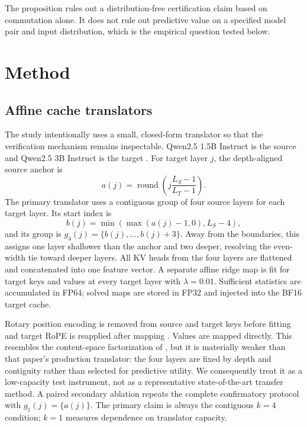 \documentclass[10pt,twocolumn]{article}
\begin{document}
The proposition rules out a distribution-free certification claim based on
commutation alone.  It does not rule out predictive value on a specified
model pair and input distribution, which is the empirical question tested
below.

\section{Method}

\subsection{Affine cache translators}

The study intentionally uses a small, closed-form translator so that the
verification mechanism remains inspectable.  Qwen2.5 1.5B Instruct is the
source and Qwen2.5 3B Instruct is the target \citep{qwen2024qwen25}.  For
target layer $j$, the depth-aligned source anchor is
\begin{equation}
  a(j)=\operatorname{round}\!\left(
  j\frac{L_S-1}{L_T-1}\right).
  \label{eq:layer-map}
\end{equation}
The primary translator uses a contiguous group of four source layers for each
target layer.  Its start index is
\begin{equation}
  b(j)=\min\!\left(\max(a(j)-1,0),L_S-4\right),
\end{equation}
and its group is $g_4(j)=\{b(j),\ldots,b(j)+3\}$.  Away from the boundaries,
this assigns one layer shallower than the anchor and two deeper, resolving the
even-width tie toward deeper layers.  All KV heads from the four layers are
flattened and concatenated into one feature vector.  A separate affine ridge
map is fit for target keys and values at every target layer with
$\lambda=0.01$.  Sufficient statistics are accumulated in FP64; solved maps
are stored in FP32 and injected into the BF16 target cache.

Rotary position encoding is removed from source and target keys before fitting
and target RoPE is reapplied after mapping \citep{su2024roformer}.  Values are
mapped directly.  This resembles the content-space factorization of
\citet{heo2026crossmodel}, but it is materially weaker than that paper's
production translator: the four layers are fixed by depth and contiguity
rather than selected for predictive utility.  We consequently treat it as a
low-capacity test instrument, not as a representative state-of-the-art
transfer method.  A paired secondary ablation repeats the complete
confirmatory protocol with $g_1(j)=\{a(j)\}$.  The primary claim is always the
contiguous $k=4$ condition; $k=1$ measures dependence on translator capacity.
\end{document}
